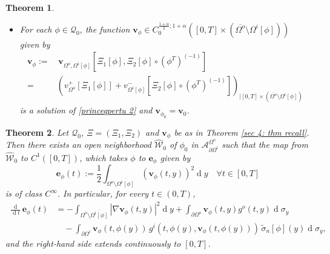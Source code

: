 \documentclass[10pt,a4paper]{amsart}
\newtheorem{theorem}{Theorem}
\renewcommand{\d}[1]{\ensuremath{\operatorname{d}\!{#1}}}
\begin{document}
\begin{theorem}
\begin{itemize}
    \item[(v)] For each $\phi \in \mathcal{Q}_0$, the function $\mathbf{v}_\phi \in C_{0}^{\frac{1+\alpha}{2}; 1+\alpha}([0,T] \times (\overline{\Omega^o} \setminus \Omega^i[\phi] ))$ given by
    \begin{equation*}
    \begin{aligned}
        \mathbf{v}_{\phi} :=& \,\mathbf{v}_{\Omega^o,\Omega^i[\phi]}\left[\Xi_1[\phi],\Xi_2[\phi]\circ (\phi^T)^{(-1)}\right]
        \\
        =&\left( v^+_{\Omega^o} [\Xi_1[\phi]] + v^-_{\Omega^i[\phi]}
        \left[\Xi_2[\phi]\circ (\phi^T)^{(-1)}\right] \right)_{| [0,T] \times (\overline{\Omega^o} \setminus {\Omega^i[\phi]})}
    \end{aligned}
    \end{equation*}
    is a solution of \eqref{princeqpertu 2} and $\mathbf{v}_{\phi_0}= \mathbf{v}_0$.
    \end{itemize}
\end{theorem}

\begin{theorem}\label{thm smooth energy robin}
    Let $\mathcal{Q}_0$, $\Xi=(\Xi_1,\Xi_2)$ and $\mathbf{v}_\phi$ be as in Theorem \ref{sec 4: thm recall}. Then there exists an open neighborhood $\widehat{\mathcal W}_0$ of $\phi_0$ in $\mathcal A_{\partial\Omega^i}^{\Omega^o}$ such that the map from $\widehat{\mathcal{W}}_0$ to $C^1([0,T])$, which takes $\phi$ to $\mathbf{e}_\phi$ given by
    \begin{equation*}
    \mathbf{e}_\phi(t) := \frac{1}{2} \int_{\Omega^o \setminus \overline{\Omega^i[\phi]}} (\mathbf{v}_\phi(t,y))^2 \d y \quad \forall t \in [0,T]
    \end{equation*}
    is of class $C^\infty$. In particular, for every $t\in(0,T)$,
    \begin{equation}\label{eq: derivative of e 2}
    \begin{aligned}
        \frac{\d{}}{\d t}\mathbf{e}_\phi(t)
        &=-\int_{\Omega^o\setminus\overline{\Omega^i[\phi]}}|\nabla \mathbf{v}_\phi(t,y)|^2 \d y
        +\int_{\partial\Omega^o} \mathbf{v}_\phi(t,y)g^o(t,y) \d\sigma_y
        \\
        &\quad -\int_{\partial\Omega^i} \mathbf{v}_\phi(t,\phi(y)) \, g^i(t,\phi(y),\mathbf{v}_\phi(t,\phi(y))) \, \tilde\sigma_n[\phi](y) \d\sigma_y,
    \end{aligned}
    \end{equation}
    and the right-hand side extends continuously to $[0,T]$.
\end{theorem}
\end{document}
